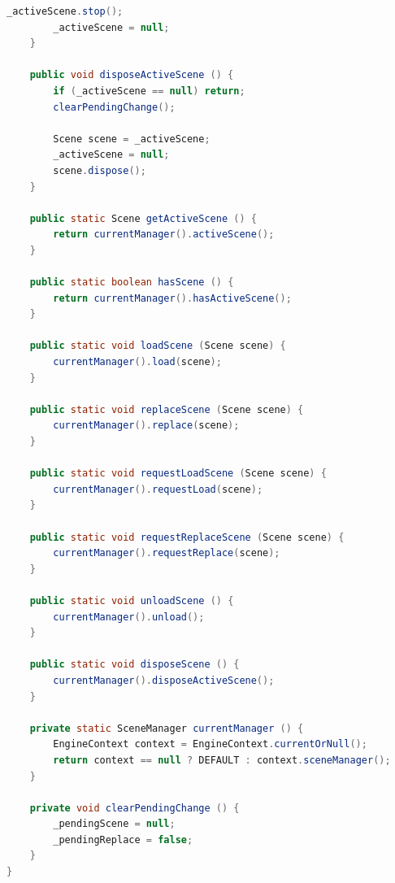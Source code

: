 \begin{lstlisting}[language=Java, frame=single]
		_activeScene.stop();
		_activeScene = null;
	}

	public void disposeActiveScene () {
		if (_activeScene == null) return;
		clearPendingChange();

		Scene scene = _activeScene;
		_activeScene = null;
		scene.dispose();
	}

	public static Scene getActiveScene () {
		return currentManager().activeScene();
	}

	public static boolean hasScene () {
		return currentManager().hasActiveScene();
	}

	public static void loadScene (Scene scene) {
		currentManager().load(scene);
	}

	public static void replaceScene (Scene scene) {
		currentManager().replace(scene);
	}

	public static void requestLoadScene (Scene scene) {
		currentManager().requestLoad(scene);
	}

	public static void requestReplaceScene (Scene scene) {
		currentManager().requestReplace(scene);
	}

	public static void unloadScene () {
		currentManager().unload();
	}

	public static void disposeScene () {
		currentManager().disposeActiveScene();
	}

	private static SceneManager currentManager () {
		EngineContext context = EngineContext.currentOrNull();
		return context == null ? DEFAULT : context.sceneManager();
	}

	private void clearPendingChange () {
		_pendingScene = null;
		_pendingReplace = false;
	}
}
\end{lstlisting}


